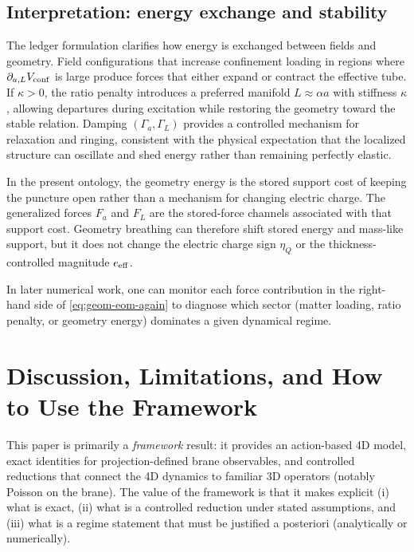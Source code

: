 \documentclass[11pt]{article}
\newcommand{\etaQ}{\eta_Q}
\newcommand{\eeff}{e_{\rm eff}}
\begin{document}
\subsection{Interpretation: energy exchange and stability}
\label{sec:geometry-interpretation}

The ledger formulation clarifies how energy is exchanged between fields and geometry. Field configurations that increase confinement loading in regions where $\partial_{a,L}V_{\rm conf}$ is large produce forces that either expand or contract the effective tube. If $\kappa>0$, the ratio penalty introduces a preferred manifold $L\approx \alpha a$ with stiffness $\kappa$, allowing departures during excitation while restoring the geometry toward the stable relation. Damping $(\Gamma_a,\Gamma_L)$ provides a controlled mechanism for relaxation and ringing, consistent with the physical expectation that the localized structure can oscillate and shed energy rather than remaining perfectly elastic.

In the present ontology, the geometry energy is the stored support cost of keeping the puncture open rather than a mechanism for changing electric charge. The generalized forces $F_a$ and $F_L$ are the stored-force channels associated with that support cost. Geometry breathing can therefore shift stored energy and mass-like support, but it does not change the electric charge sign $\etaQ$ or the thickness-controlled magnitude $\eeff$.

In later numerical work, one can monitor each force contribution in the right-hand side of \eqref{eq:geom-eom-again} to diagnose which sector (matter loading, ratio penalty, or geometry energy) dominates a given dynamical regime.

\section{Discussion, Limitations, and How to Use the Framework}
\label{sec:discussion}

This paper is primarily a \emph{framework} result: it provides an action-based 4D model, exact identities for projection-defined brane observables, and controlled reductions that connect the 4D dynamics to familiar 3D operators (notably Poisson on the brane). The value of the framework is that it makes explicit (i) what is exact, (ii) what is a controlled reduction under stated assumptions, and (iii) what is a regime statement that must be justified a posteriori (analytically or numerically).
\end{document}
